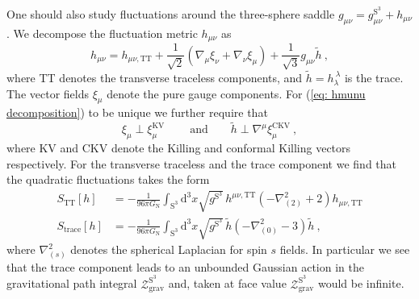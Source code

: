 \documentclass[12pt,a4paper]{article}
\renewcommand\d{\text{d}}
\begin{document}
One should also study fluctuations around the three-sphere saddle $g_{\mu\nu} = g_{\mu\nu}^{\text{S}^3} + h_{\mu\nu}$. We decompose the fluctuation metric $h_{\mu\nu}$ as
\begin{equation}\label{eq: hmunu decomposition}
    h_{\mu\nu} = h_{\mu\nu,\mathrm{TT}} + \frac{1}{\sqrt{2}}(\nabla_\mu\xi_\nu + \nabla_\nu\xi_\mu) +\frac{1}{\sqrt{3}} g_{\mu\nu} \tilde{h}~,
\end{equation}
where TT denotes the transverse traceless components, and  $\tilde{h}= h_\lambda^{~\lambda}$ is the trace. The vector fields $\xi_\mu$ denote the pure gauge components. For (\ref{eq: hmunu decomposition}) to be unique we further require that 
\begin{equation}\label{eq: orthogonality}
    \xi_\mu \perp \xi_\mu^{\mathrm{KV}}~\quad \quad \mathrm{and}\quad\quad   \tilde{h} \perp \nabla^\mu\xi_\mu^{\mathrm{CKV}}~,
\end{equation}
where KV and CKV denote the Killing and conformal Killing vectors respectively. 
For the transverse traceless and the trace component we find that the quadratic fluctuations takes the form
\begin{subequations}
\begin{align}\label{eq: hTT}
        S_{\mathrm{TT}}[h]&= -\frac{1}{96\pi G_{\text{N}}}\int_{\text{S}^3} \d^3 x\sqrt{{g}^{\text{S}^3}} \,h^{\mu\nu,\mathrm{TT}}\!\left(-{\nabla}_{(2)}^2 + 2\right)\!h_{\mu\nu,\mathrm{TT}}\\ \label{eq: conformal factor}
        S_{\mathrm{trace}}[h]&= -\frac{1}{96\pi G_{\text{N}}}\int_{\text{S}^3} \d^3 x\sqrt{{g}^{\text{S}^3}} \,\tilde{h}\!\left(-{\nabla}_{(0)}^2 - 3\right)\!\tilde{h}~,
\end{align}
\end{subequations}
where $\nabla_{(s)}^{2}$ denotes the spherical Laplacian for spin $s$ fields. 
In particular we see that the trace component leads to an unbounded Gaussian action in the gravitational path integral $\mathcal{Z}_\mathrm{grav}^{\text{S}^3}$ and, taken at face value $\mathcal{Z}_\mathrm{grav}^{\text{S}^3}$ would be infinite. 
\end{document}
